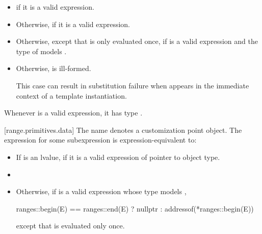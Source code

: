 \begin{addedblock}
\begin{itemize}
\item
   if it is a valid expression.

\item
  Otherwise,  if it is a valid expression.

\item
  Otherwise, 
  except that  is only evaluated once, if 
   is a valid expression and the type of
   models .

\item
  Otherwise,  is ill-formed.
  {\color{newclr}
  \begin{note}
  This case can result in substitution failure when 
  appears in the immediate context of a template instantiation.
  \end{note}
  } %
\end{itemize}

\pnum
\begin{note}
Whenever  is a valid expression,
it has type .
\end{note}

[range.primitives.data]{}
\pnum
The name  denotes a customization point
object. The expression
 for some subexpression  is
expression-equivalent to:

\begin{itemize}
\item
  If  is an lvalue, 
  if it is a valid expression of pointer to object type.

\item

\item
  Otherwise, if  is a valid expression whose type models
  ,
  \begin{codeblock}
  ranges::begin(E) == ranges::end(E) ? nullptr : addressof(*ranges::begin(E))
  \end{codeblock}
  except that  is evaluated only once.


\end{itemize}
\end{addedblock}

